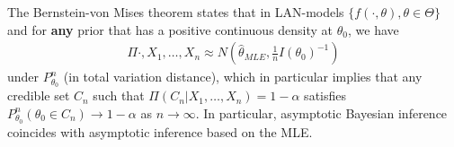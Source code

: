 \begin{thm}
  \label{defn:bayesian_inference:1}
  The Bernstein-von Mises theorem states that in LAN-models $\{
  f(\cdot, \theta), \theta \in \Theta \}$ and for \textbf{any} prior
  that has a positive continuous density at $\theta_{0}$, we have
  \begin{align}
    \label{eq:100}
    \Pi{\cdot, X_{1}, \dots, X_{n}} \approx N(\hat \theta_{MLE}, \frac{1}{n}I(\theta_{0})^{-1})
  \end{align} under $P_{\theta_{0}}^{n}$ (in total variation
  distance), which in particular implies that any credible set $C_{n}$
  such that $\Pi(C_{n} | X_{1}, \dots, X_{n}) = 1 - \alpha$ satisfies
  $P_{\theta_{0}}^{n}(\theta_{0} \in C_{n}) \rightarrow 1 - \alpha$ as
  $n \rightarrow \infty$.  In particular, asymptotic Bayesian inference
  coincides with asymptotic inference based on the MLE.
\end{thm}



